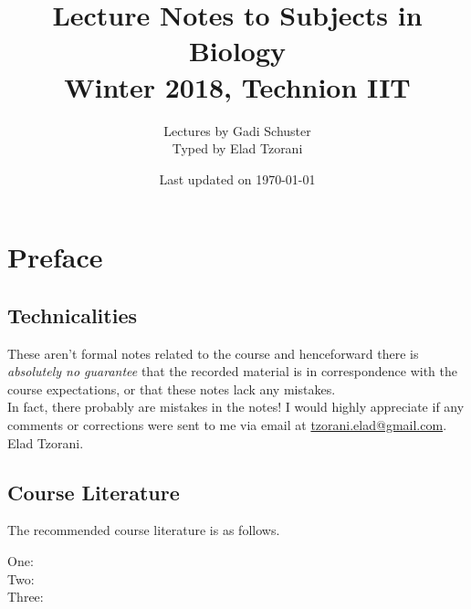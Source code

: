\documentclass[10pt,a4paper,twoside,openany,hidelinks]{book}
\title{Lecture Notes to Subjects in Biology \\ \large{Winter 2018, Technion IIT}}
\author{Lectures by Gadi Schuster \\ \large{Typed by Elad Tzorani}}
\date{Last updated on \today}
\begin{document}
\frontmatter
{}
\tableofcontents
\countlectures
\newpage

\chapter*{Preface}
 

\section*{Technicalities}

These aren't formal notes related to the course and henceforward there is \emph{absolutely no guarantee} that the recorded material is in correspondence with the course expectations, or that these notes lack any mistakes.\\
In fact, there probably are mistakes in the notes! I would highly appreciate if any comments or corrections were sent to me via email at \href{mailto:tzorani.elad@gmail.com}{tzorani.elad@gmail.com}.\\
Elad Tzorani.

\section*{Course Literature}

The recommended course literature is as follows.
\begin{description}
\item[One:]

\item[Two:]

\item[Three:]
\end{description}

\mainmatter


\backmatter
\end{document}
